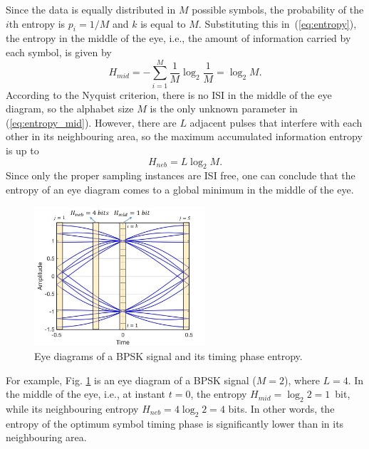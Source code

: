 \documentclass[journal,comsoc]{IEEEtran}
\begin{document}
Since the data is equally distributed in \(M\) possible symbols, 
the probability of the $i$th entropy is \(p_i=1/M\) and $k$ is equal to $M$.
Substituting this in~(\ref{eq:entropy}), the entropy in the middle of the eye,
i.e., the amount of information carried by each symbol, is given by
\begin{equation}
H_{mid} =  - \sum\limits_{i = 1}^M {{\frac{1}{M}}\log_2 {\frac{1}{M}}}=\log_2 {M}.
\label{eq:entropy_mid}
\end{equation}
According to the Nyquist criterion, there is no ISI in the middle of the eye diagram, so the alphabet size \(M\) is the only unknown parameter in (\ref{eq:entropy_mid}).
However, there are \(L\) adjacent pulses that interfere with each other in its neighbouring area,
so the maximum accumulated information entropy is up to
\begin{equation}
H_{neb} =  L\log_2 {M}.
\label{eq:entropy_neb}
\end{equation}
Since only the proper sampling instances are ISI free,
one can conclude that the entropy of an eye diagram comes to a global minimum in the middle of the eye. 

\begin{figure}[htbp]
\centering
\includegraphics[width=2.5in]{sym_rate_right3.jpg}
\caption{Eye diagrams of a BPSK signal and its timing phase entropy.}
\label{fig:eyediagram} 
\end{figure}


For example, Fig. \ref{fig:eyediagram} is an eye diagram of a BPSK signal ($M=2$), where \(L=4\). 
In the middle of the eye, i.e., at instant $t=0$, the entropy \(H_{mid} = \log_2 2 = 1\)~bit, 
while its neighbouring entropy \(H_{neb} = 4\log_2 2 = 4\) bits.
In other words, the entropy of the optimum symbol timing phase is significantly lower than in its neighbouring area.
\end{document}
